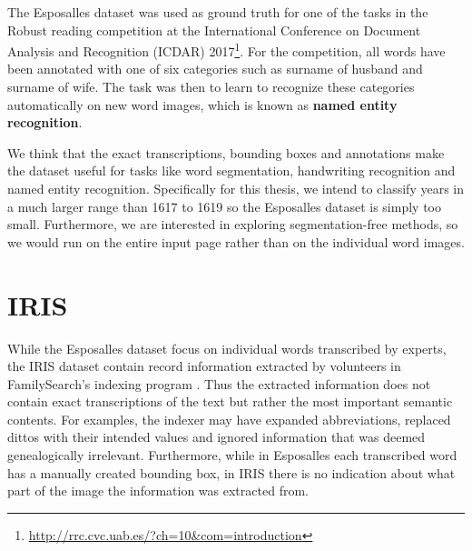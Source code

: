 The Esposalles dataset was used as ground truth for one of the tasks in the Robust reading competition at the International Conference on Document Analysis and Recognition (ICDAR) 2017\footnote{\url{http://rrc.cvc.uab.es/?ch=10&com=introduction}}.
For the competition, all words have been annotated with one of six categories such as
surname of husband and surname of wife. The task was then to learn to recognize these categories automatically on new word images, which is known as \textbf{named entity recognition}.

We think that the exact transcriptions, bounding boxes and annotations make the dataset useful for
tasks like word segmentation, handwriting recognition and named entity recognition.
Specifically for this thesis, we intend to classify years in a much larger range than 1617 to 1619 so the Esposalles dataset is simply too small. Furthermore, we are interested in exploring segmentation-free methods, so we would run on the entire input page rather than on the individual word images.




\section{IRIS}

While the Esposalles dataset focus on individual words transcribed by experts, the IRIS dataset contain record information extracted by volunteers in FamilySearch's indexing program \cite{Iris}.
Thus the extracted information does not contain exact transcriptions of the text but rather the most important semantic contents.
For examples, the indexer may have expanded abbreviations, replaced dittos with their intended values and ignored information that was deemed genealogically irrelevant.
Furthermore, while in Esposalles each transcribed word has a manually created bounding box, in IRIS there is no indication about what part of the image the information was extracted from.

